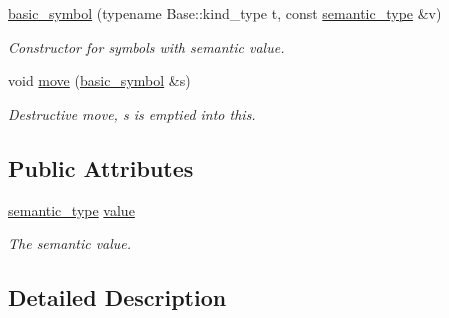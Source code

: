 \begin{DoxyCompactItemize}
\item 
\hypertarget{structyy_1_1parser_1_1basic__symbol_a56d8d7f7e389fa9e8eccaf36d61bf828}{}\hyperlink{structyy_1_1parser_1_1basic__symbol_a56d8d7f7e389fa9e8eccaf36d61bf828}{basic\+\_\+symbol} (typename Base\+::kind\+\_\+type t, const \hyperlink{classyy_1_1parser_a0ce15da9cf616a7197b81e6055428165}{semantic\+\_\+type} \&v)\label{structyy_1_1parser_1_1basic__symbol_a56d8d7f7e389fa9e8eccaf36d61bf828}

\begin{DoxyCompactList}\small\item\em Constructor for symbols with semantic value. \end{DoxyCompactList}\item 
\hypertarget{structyy_1_1parser_1_1basic__symbol_acd8919976d679380b4702a973134b4e3}{}void \hyperlink{structyy_1_1parser_1_1basic__symbol_acd8919976d679380b4702a973134b4e3}{move} (\hyperlink{structyy_1_1parser_1_1basic__symbol}{basic\+\_\+symbol} \&s)\label{structyy_1_1parser_1_1basic__symbol_acd8919976d679380b4702a973134b4e3}

\begin{DoxyCompactList}\small\item\em Destructive move, {\itshape s} is emptied into this. \end{DoxyCompactList}\end{DoxyCompactItemize}
\subsection*{Public Attributes}
\begin{DoxyCompactItemize}
\item 
\hypertarget{structyy_1_1parser_1_1basic__symbol_a07710fa55ed90f64504e2fe9b09802ca}{}\hyperlink{classyy_1_1parser_a0ce15da9cf616a7197b81e6055428165}{semantic\+\_\+type} \hyperlink{structyy_1_1parser_1_1basic__symbol_a07710fa55ed90f64504e2fe9b09802ca}{value}\label{structyy_1_1parser_1_1basic__symbol_a07710fa55ed90f64504e2fe9b09802ca}

\begin{DoxyCompactList}\small\item\em The semantic value. \end{DoxyCompactList}\end{DoxyCompactItemize}


\subsection{Detailed Description}
